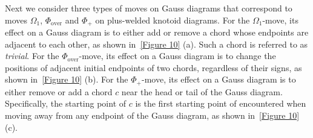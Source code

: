 \documentclass[11pt]{amsart}
\theoremstyle{noparens}
\numberwithin{equation}{section}
\numberwithin{equation}{section}
\begin{document}
Next we consider three types of moves on Gauss diagrams that correspond to moves $\Omega_{1}$, $\Phi_{\text{over}}$ and $\Phi_+$ on plus-welded knotoid diagrams.
For the $\Omega_1$-move, its effect on a Gauss diagram is to either add or remove a chord whose endpoints are adjacent to each other, as shown in~\cref{Figure 10} (a). Such a chord is referred to as \textit{trivial}.
For the $\Phi_{\text{over}}$-move, its effect on a Gauss diagram is to change the positions of adjacent initial endpoints of two chords, regardless of their signs, as shown in~\cref{Figure 10} (b). 
For the $\Phi_+$-move, its effect on a Gauss diagram is to either remove or add a chord $c$ near the head or tail of the Gauss diagram. Specifically, the starting point of $c$ is the first starting point of encountered when moving away from any endpoint of the Gauss diagram, as shown in~\cref{Figure 10} (c).  

\smallskip 
\end{document}
